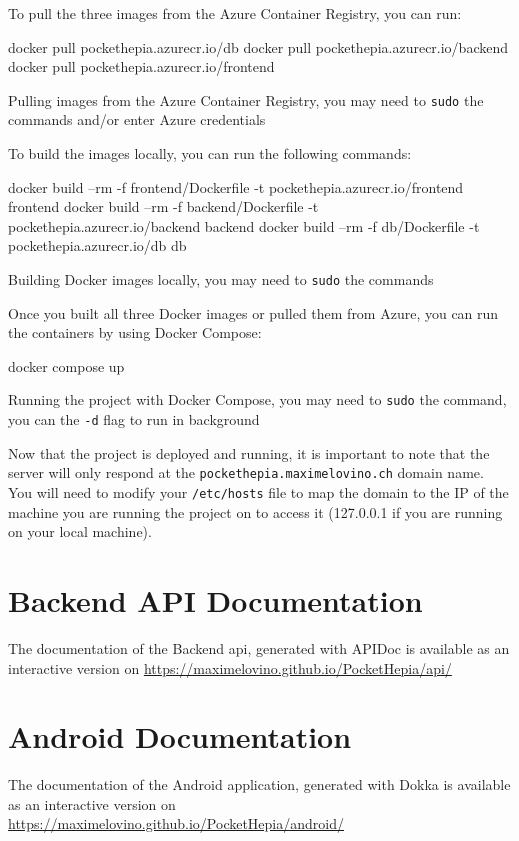 \documentclass[twoside, openright,11pt,a4paper]{book}
\newenvironment{code}{\captionsetup{type=listing}}{}
\begin{document}
\begin{appendices}
To pull the three images from the Azure Container Registry, you can run:
\begin{code}
\begin{shell}
docker pull pockethepia.azurecr.io/db
docker pull pockethepia.azurecr.io/backend
docker pull pockethepia.azurecr.io/frontend
\end{shell}
	\caption[Pulling images from the Azure Container Registry]{Pulling images from the Azure Container Registry, you may need to \texttt{sudo} the commands and/or enter Azure credentials}
\end{code}
To build the images locally, you can run the following commands:
\begin{code}
\begin{shell}
docker build --rm -f frontend/Dockerfile -t pockethepia.azurecr.io/frontend frontend
docker build --rm -f backend/Dockerfile -t pockethepia.azurecr.io/backend backend
docker build --rm -f db/Dockerfile -t pockethepia.azurecr.io/db db
\end{shell}
	\caption[Building Docker images locally]{Building Docker images locally, you may need to \texttt{sudo} the commands}
\end{code}

Once you built all three Docker images or pulled them from Azure, you can run the containers by using Docker Compose:
\begin{code}
\begin{shell}
docker compose up
\end{shell}
	\caption[Running the project with Docker Compose]{Running the project with Docker Compose, you may need to \texttt{sudo} the command, you can the \texttt{-d} flag to run in background}
\end{code}

Now that the project is deployed and running, it is important to note that the server will only respond at the \verb+pockethepia.maximelovino.ch+ domain name. You will need to modify your \verb+/etc/hosts+ file to map the domain to the IP of the machine you are running the project on to access it (127.0.0.1 if you are running on your local machine).
\chapter{Backend API Documentation}
\label{appendix_api_doc}
The documentation of the Backend \gls{api}, generated with APIDoc is available as an interactive version on \url{https://maximelovino.github.io/PocketHepia/api/}
\chapter{Android Documentation}
The documentation of the Android application, generated with Dokka is available as an interactive version on \url{https://maximelovino.github.io/PocketHepia/android/}
\end{appendices}
\end{document}
